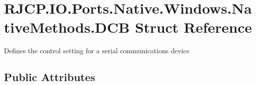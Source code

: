 \hypertarget{struct_r_j_c_p_1_1_i_o_1_1_ports_1_1_native_1_1_windows_1_1_native_methods_1_1_d_c_b}{}\section{R\+J\+C\+P.\+I\+O.\+Ports.\+Native.\+Windows.\+Native\+Methods.\+D\+CB Struct Reference}
\label{struct_r_j_c_p_1_1_i_o_1_1_ports_1_1_native_1_1_windows_1_1_native_methods_1_1_d_c_b}


Defines the control setting for a serial communications device  


\subsection*{Public Attributes}

